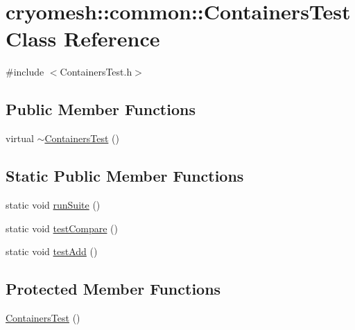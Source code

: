 \hypertarget{classcryomesh_1_1common_1_1_containers_test}{
\section{cryomesh::common::ContainersTest Class Reference}
\label{classcryomesh_1_1common_1_1_containers_test}
}


{\ttfamily \#include $<$ContainersTest.h$>$}

\subsection*{Public Member Functions}
\begin{DoxyCompactItemize}
\item 
virtual \hyperlink{classcryomesh_1_1common_1_1_containers_test_adb6d3d320b5815119a715b3fd84b85dc}{$\sim$ContainersTest} ()
\end{DoxyCompactItemize}
\subsection*{Static Public Member Functions}
\begin{DoxyCompactItemize}
\item 
static void \hyperlink{classcryomesh_1_1common_1_1_containers_test_aaa3fdced3fbec0ee448776d1c3923b7c}{runSuite} ()
\item 
static void \hyperlink{classcryomesh_1_1common_1_1_containers_test_a01358396840aa1cdb811aa0412caea47}{testCompare} ()
\item 
static void \hyperlink{classcryomesh_1_1common_1_1_containers_test_a36e9b84b40110b9f9ba37cc2ac5b4cd6}{testAdd} ()
\end{DoxyCompactItemize}
\subsection*{Protected Member Functions}
\begin{DoxyCompactItemize}
\item 
\hyperlink{classcryomesh_1_1common_1_1_containers_test_ae57f1e70d5904be4353ec3deec4d2bbf}{ContainersTest} ()
\end{DoxyCompactItemize}


